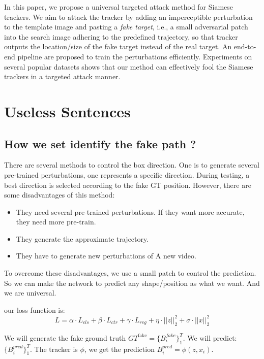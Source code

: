 \documentclass{article}
\begin{document}
In this paper, we propose a universal targeted attack method for Siamese trackers. 
We aim to attack the tracker by adding an imperceptible perturbation to the template image and pasting a \textit{fake target}, i.e., a small adversarial patch into the search image adhering to the predefined trajectory, so that tracker outputs the location/size of the fake target instead of the real target. An end-to-end pipeline are proposed to train the perturbations efficiently.
Experiments on several popular datasets shows that our method can effectively fool the Siamese trackers in a targeted attack manner.

\clearpage



\section{Useless Sentences}

\subsection{How we set identify the fake path ?}

There are several methods to control the box direction. One is to generate several pre-trained perturbations, one represents a specific direction. During testing, a best direction is selected according to the fake GT position. However, there are some disadvantages of this method:
\begin{itemize}
\item They need several pre-trained perturbations. If they want more accurate, they need more pre-train.
\item They generate the approximate trajectory.
\item They have to generate  new perturbations of A new video.
\end{itemize}
To overcome these disadvantages, we use a small patch to control the prediction. So we can make the network to predict any shape/position as what we want. And we are universal.

our loss function is:
\begin{equation}
L = \alpha \cdot L_{cls} + \beta \cdot L_{ctr} +  \gamma \cdot L_{reg} + \eta \cdot ||z||_2^2 +  \sigma \cdot ||x||^2_2
\end{equation}

We will generate the fake ground truth $GT^{\text{fake}}=\{B^{fake}_i\}_1^T$.
We will predict: $\{B^{pred}_i\}_1^T$.
The tracker is $\phi$, we get the prediction $B_i^{pred}=\phi(z, x_i)$.
\end{document}
